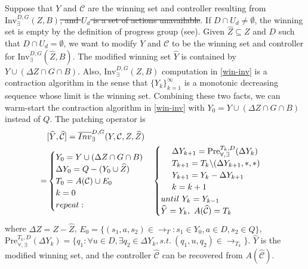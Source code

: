 Suppose that $ Y $ and $ \mathcal{C} $ are the winning set and controller resulting from $ \text{Inv}_{\exists}^{D,G}(Z,B) ${\color{teal}\sout{, and $ U_d $ is a set of actions unavailable}}. If $ D\cap U_d \not= \emptyset$, the winning set is empty by the definition of progress group (see\cite{Nilsson2017}). Given $ \widehat{Z} \subseteq Z $ and $D$ such that $ D\cap U_d=\emptyset $, we want to modify $ Y $ and $ \mathcal{C} $ to be the winning set and controller for $ \text{Inv}_{\exists}^{D,G}(\widehat{Z}, B) $.  The modified winning set $\widehat{Y}$ is contained by $ Y\cup (\Delta Z\cap G\cap B) $. Also, $ \text{Inv}_{\exists}^{D,G}(Z,B) $ computation in \eqref{win-inv} is a contraction algorithm in the sense that $ \{Y_k\}_{k=1}^{\infty} $ is a monotonic decreasing sequence whose limit is the winning set. Combining these two facts, we can warm-start the contraction algorithm in \eqref{win-inv} with $ Y_0=Y\cup (\Delta Z\cap G\cap B)$ instead of $ Q $. The patching operator is
{\small\begin{align}
&[\widehat{Y},\widehat{\mathcal{C}}]=\overline{Inv}_{\exists}^{D,G}(Y,\mathcal{C},Z,\widehat{Z})\nonumber \\
=&\begin{cases}
Y_0 = Y\cup (\Delta Z\cap G \cap B)\\
\Delta Y_0 = Q - (Y_0 \cup \widehat{Z})\\
T_0  = A(\mathcal{C})\cup E_0\\
{\color{black} k=0}\\
{\color{black} repeat:}\\
\end{cases}
\begin{cases}
\ \ \ \ \Delta Y_{k+1} = \text{Pre}_{\forall,\exists}^{T_k,D}(\Delta Y_k) \\
\ \ \ \ T_{k+1} = T_{k}\backslash (\Delta Y_{k+1},*,*)\\
\ \ \ \ Y_{k+1} = Y_k- \Delta Y_{k+1}\\
\ \ \ \ {\color{black} k=k+1}\\
{\color{black} until \ Y_k = Y_{k-1}}\\
\widehat{Y}=Y_k,\ A(\widehat{\mathcal{C}}) = T_{k}
\end{cases}\label{patch-inv}
\end{align}}
where $ \Delta Z = Z - \widehat{Z} $, $ E_0 = \{(s_1,a,s_2)\in \rightarrow_{T}: s_1\in Y_0, a\in D, s_2 \in Q\} $, $ \text{Pre}_{\forall,\exists}^{T_k,D}(\Delta Y_k) = \{q_1: \forall u\in D, \exists q_2\in \Delta Y_k, s.t.\ (q_1, u, q_2) \in \rightarrow_{T_k} \} $. $ \widehat{Y} $ is the modified winning set, and the controller $ \widehat{\mathcal{C}} $ can be recovered from $ A(\widehat{\mathcal{C}}) $.

